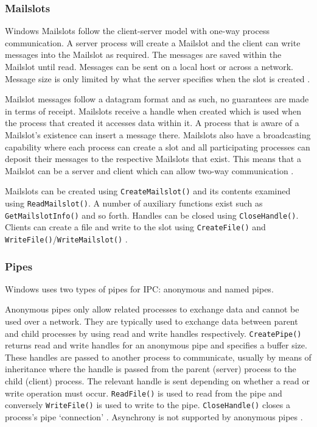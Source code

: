 \documentclass[12pt,a4paper,oneside]{article}
\def\code#1{\texttt{#1}}
\begin{document}
    \subsubsection{Mailslots}
      Windows Mailslots follow the client-server model with one-way process communication. A server process will create a Mailslot and the client can write messages into the Mailslot as required. The messages are saved within the Mailslot until read. Messages can be sent on a local host or across a network. Message size is only limited by what the server specifies when the slot is created \citep{MSDN_API}.

      Mailslot messages follow a datagram format and as such, no guarantees are made in terms of receipt. Mailslots receive a handle when created which is used when the process that created it accesses data within it. A process that is aware of a Mailslot's existence can insert a message there. Mailslots also have a broadcasting capability where each process can create a slot and all participating processes can deposit their messages to the respective Mailslots that exist. This means that a Mailslot can be a server and client which can allow two-way communication \citep{MSDN_API}.

      Mailslots can be created using \code{CreateMailslot()} and its contents examined using \code{ReadMailslot()}. A number of auxiliary functions exist such as \code{GetMailslotInfo()} and so forth. Handles can be closed using \code{CloseHandle()}. Clients can create a file and write to the slot using \code{CreateFile()} and \code{WriteFile()}/\code{WriteMailslot()} \citep{IPCWindowsLinkedInSlides}.

    \subsubsection{Pipes}
      Windows uses two types of pipes for IPC: anonymous and named pipes.

      Anonymous pipes only allow related processes to exchange data and cannot be used over a network. They are typically used to exchange data between parent and child processes by using read and write handles respectively. \code{CreatePipe()} returns read and write handles for an anonymous pipe and specifies a buffer size. These handles are passed to another process to communicate, usually by means of inheritance where the handle is passed from the parent (server) process to the child (client) process. The relevant handle is sent depending on whether a read or write operation must occur. \code{ReadFile()} is used to read from the pipe and conversely \code{WriteFile()} is used to write to the pipe. \code{CloseHandle()} closes a process's pipe `connection' \citep{MSDN_API}. Asynchrony is not supported by anonymous pipes \citep{lewandowski1997interprocess}.
\end{document}
